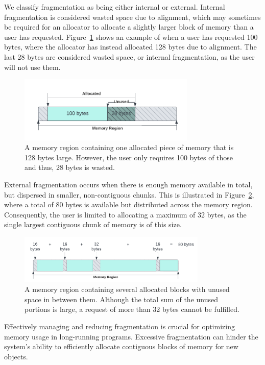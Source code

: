 
We classify fragmentation as being either internal or external. Internal fragmentation is considered wasted space due to alignment, which may sometimes be required for an allocator to allocate a slightly larger block of memory than a user has requested. Figure~\ref{fig:internal_fragmentation} shows an example of when a user has requested 100 bytes, where the allocator has instead allocated 128 bytes due to alignment. The last 28 bytes are considered wasted space, or internal fragmentation, as the user will not use them.

\begin{figure}[H]
    \centering
    \includegraphics[width=0.75\textwidth]{figures/internal_fragmentation.png}
    \caption{A memory region containing one allocated piece of memory that is 128 bytes large. However, the user only requires 100 bytes of those and thus, 28 bytes is wasted.}
    \label{fig:internal_fragmentation}
\end{figure}

External fragmentation occurs when there is enough memory available in total, but dispersed in smaller, non-contiguous chunks. This is illustrated in Figure~\ref{fig:external_fragmentation}, where a total of 80 bytes is available but distributed across the memory region. Consequently, the user is limited to allocating a maximum of 32 bytes, as the single largest contiguous chunk of memory is of this size.

\begin{figure}[H]
    \centering
    \includegraphics[width=0.8\textwidth]{figures/external_fragmentation.png}
    \caption{A memory region containing several allocated blocks with unused space in between them. Although the total sum of the unused portions is large, a request of more than 32 bytes cannot be fulfilled.}
    \label{fig:external_fragmentation}
\end{figure}

Effectively managing and reducing fragmentation is crucial for optimizing memory usage in long-running programs. Excessive fragmentation can hinder the system's ability to efficiently allocate contiguous blocks of memory for new objects.

